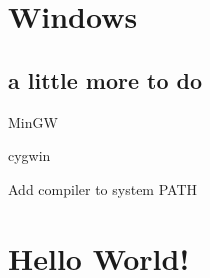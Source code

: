 \section{Windows}
\subsection{a little more to do}
\begin{frame}{MinGW}
	
\end{frame}
\begin{frame}{cygwin}
	
\end{frame}
\begin{frame}{Add compiler to system PATH}
	
\end{frame}

\section{Hello World!}
